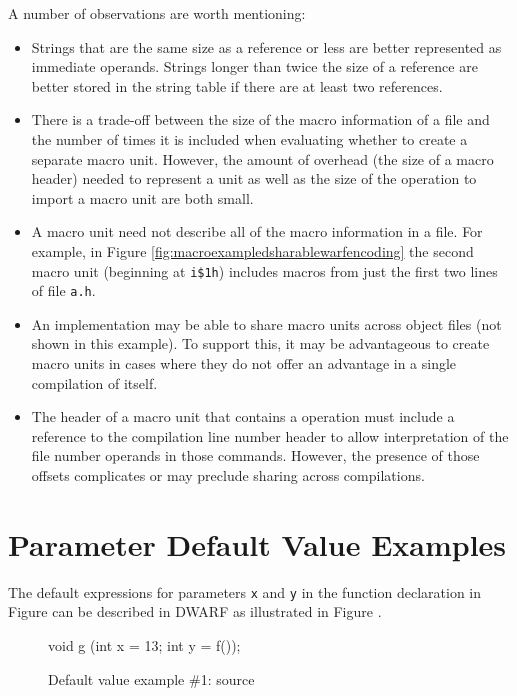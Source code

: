 A number of observations are worth mentioning:
\begin{itemize}
\item
Strings that are the same size as a reference or less are
better represented as immediate operands. Strings longer
than twice the size of a reference are better stored in the
string table if there are at least two references.

\item
There is a trade-off between the size of the macro information
of a file and the number of times it is included when evaluating
whether to create a separate macro unit. However, the amount
of overhead (the size of a macro header) needed to represent a
unit as well as the size of the operation to import a macro unit
are both small.

\item
A macro unit need not describe all of the macro information in
a file. For example, in Figure \ref{fig:macroexampledsharablewarfencoding}
the second macro unit (beginning at \texttt{i\$1h}) includes macros
from just the first two lines of file \texttt{a.h}.

\item
An implementation may be able to share macro units across object
files (not shown in this example). To support this, it may be
advantageous to create macro units in cases where they do not
offer an advantage in a single compilation of itself.

\item
The header of a macro unit that contains a \DWMACROstartfile{}
operation must include a reference to the compilation line number 
header to allow interpretation of the file number operands in
those commands. However, the presence of those offsets complicates
or may preclude sharing across compilations.

\end{itemize}

\clearpage
\section{Parameter Default Value Examples}
\bb
The default expressions for parameters \texttt{x} and \texttt{y} in 
the \Cplusplus{} function declaration in Figure   
can be described in DWARF as illustrated in
Figure .
\eb

\begin{figure}[h]
\begin{nlnlisting}
    void g (int x = 13;
            int y = f());

\end{nlnlisting}
\caption{Default value example \#1: \Cplusplus{} source}
\label{fig:defaultvalueexampleonesource}
\end{figure}

